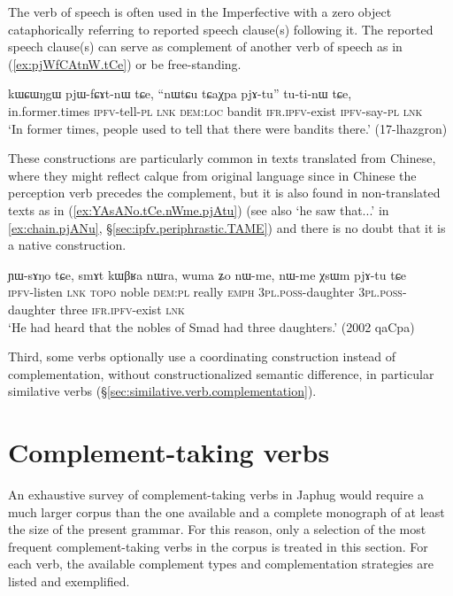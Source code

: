 The verb of speech  is often used in the Imperfective with a zero object cataphorically referring to reported speech clause(s) following it. The reported speech clause(s) can serve as complement of another verb of speech as in (\ref{ex:pjWfCAtnW.tCe}) or be free-standing.

\begin{exe}
	\ex \label{ex:pjWfCAtnW.tCe}
	\gll kɯɕɯŋgɯ pjɯ-fɕɤt-nɯ tɕe, ``nɯtɕu tɕaχpa pjɤ-tu'' tu-ti-nɯ tɕe,  \\
	in.former.times \textsc{ipfv}-tell-\textsc{pl} \textsc{lnk} \textsc{dem}:\textsc{loc} bandit \textsc{ifr}.\textsc{ipfv}-exist \textsc{ipfv}-say-\textsc{pl} \textsc{lnk} \\
	\glt `In former times, people used to tell that there were bandits there.' (17-lhazgron)
\end{exe}

These constructions are particularly common in texts translated from Chinese, where they might reflect calque from original language since in Chinese the perception verb precedes the complement, but it is also found in non-translated texts as in (\ref{ex:YAsANo.tCe.nWme.pjAtu}) (see also  `he saw that...' in  \ref{ex:chain.pjANu}, §\ref{sec:ipfv.periphrastic.TAME}) and there is no doubt that it is a native construction.

\begin{exe}
	\ex \label{ex:YAsANo.tCe.nWme.pjAtu}
	\gll ɲɯ-sɤŋo tɕe, smɤt kɯβʁa nɯra, wuma ʑo nɯ-me, nɯ-me χsɯm pjɤ-tu tɕe \\
	\textsc{ipfv}-listen \textsc{lnk}  \textsc{topo} noble \textsc{dem}:\textsc{pl} really \textsc{emph} \textsc{3pl}.\textsc{poss}-daughter  \textsc{3pl}.\textsc{poss}-daughter  three \textsc{ifr}.\textsc{ipfv}-exist \textsc{lnk} \\
	\glt `He had heard that the nobles of Smad had three daughters.' (2002 qaCpa) 
\end{exe}

Third, some verbs optionally use a coordinating construction instead of complementation, without constructionalized semantic difference, in particular similative verbs (§\ref{sec:similative.verb.complementation}).


\section{Complement-taking verbs} \label{sec:complement.taking.verbs}

An exhaustive survey of complement-taking verbs in Japhug would require a much larger corpus than the one available and a complete monograph of at least the size of the present grammar. For this reason, only a selection of the most frequent complement-taking verbs in the corpus is treated in this section. For each verb, the available complement types and complementation strategies are listed and exemplified.

